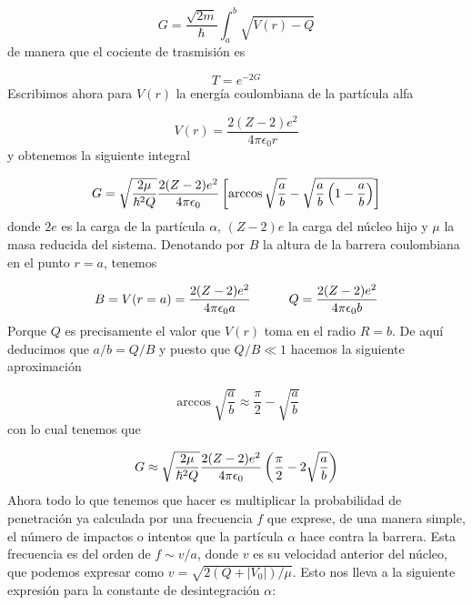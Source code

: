 \begin{equation}
    G = \frac{\sqrt{2m}}{\hbar} \int_a^b \sqrt{V(r)-Q}
\end{equation}
de manera que el cociente de trasmisión es

\begin{equation}
    T = e^{-2G}
\end{equation}
Escribimos ahora para $V(r)$ la energía coulombiana de la partícula alfa 

\begin{equation}
    V(r) = \frac{2(Z-2)e^2}{4\pi \epsilon_0 r}
\end{equation}
y obtenemos la siguiente integral

\begin{equation}
    G = \sqrt{\frac{2\mu}{\hbar^2Q}} \frac{2(Z-2)e^2}{4 \pi \epsilon_0} \left[ \arccos \sqrt{\frac{a}{b}}- \sqrt{\frac{a}{b}\left( 1-\frac{a}{b} \right)} \right]
\end{equation}
donde $2e$ es la carga de la partícula $\alpha$, $(Z-2)e$ la carga del núcleo hijo y $\mu$ la masa reducida del sistema. Denotando por $B$ la altura de la barrera coulombiana en el punto $r=a$, tenemos 

\begin{equation}
    B= V(r=a) = \frac{2(Z-2)e^2}{4\pi \epsilon_0 a} \quad \quad \quad Q=\frac{2(Z-2)e^2}{4 \pi \epsilon_0 b}
\end{equation}
Porque $Q$ es precisamente el valor que $V(r)$ toma en el radio $R=b$. De aquí deducimos que $a/b=Q/B$ y puesto que $Q/B\ll 1$ hacemos la siguiente aproximación 

\begin{equation}
    \arccos \sqrt{\frac{a}{b}} \approx \frac{\pi}{2} - \sqrt{\frac{a}{b}}
\end{equation}
con lo cual tenemos que 

\begin{equation}
    G \approx  \sqrt{\frac{2\mu}{\hbar^2Q}} \frac{2(Z-2)e^2}{4 \pi \epsilon_0} \left( \frac{\pi}{2} -2 \sqrt{\frac{a}{b}} \right)
\end{equation}
Ahora todo lo que tenemos que hacer es multiplicar la probabilidad de penetración ya calculada por una frecuencia $f$ que exprese, de una manera simple, el número de impactos o intentos que la partícula $\alpha$ hace contra la barrera. Esta frecuencia es del orden de $f \sim v/a$, donde $v$ es su velocidad anterior del núcleo, que podemos expresar como $v=\sqrt{2(Q+|V_0|)/\mu}$. Esto nos lleva a la siguiente expresión para la constante de desintegración $\alpha$:

